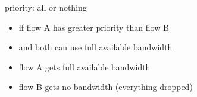 \begin{frame}{priority: all or nothing}
    \begin{itemize}
    \item if flow A has greater priority than flow B
    \item and both can use full available bandwidth
    \vspace{.5cm}
    \item flow A gets full available bandwidth
    \item flow B gets no bandwidth (everything dropped)
    \end{itemize}
\end{frame}
